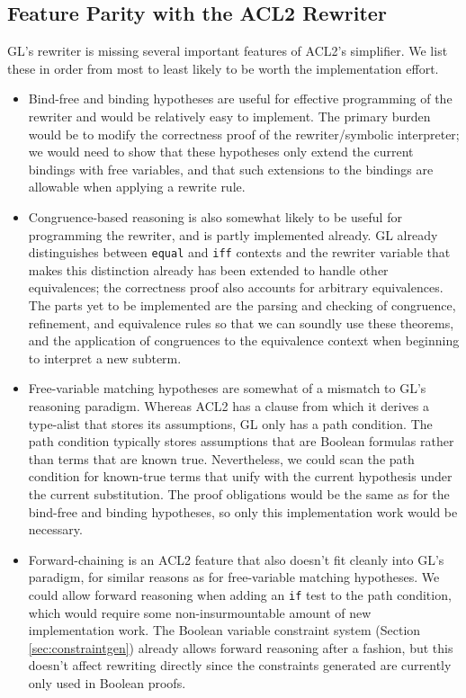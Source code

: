\documentclass[submission,copyright,creativecommons]{eptcs}
\begin{document}
\subsection{Feature Parity with the ACL2 Rewriter}
\label{sec:parity}
GL's rewriter is missing several important features of ACL2's
simplifier.  We list these in order from most to least likely to be
worth the implementation effort.
\begin{itemize}
\item Bind-free and binding hypotheses are useful for effective
  programming of the rewriter and would be relatively easy to
  implement.  The primary burden would be to modify the correctness
  proof of the rewriter/symbolic interpreter; we would need to show that these
  hypotheses only extend the current bindings with free variables, and
  that such extensions to the bindings are allowable when applying a
  rewrite rule.

\item Congruence-based reasoning is also somewhat likely to be useful
  for programming the rewriter, and is partly implemented already.  GL
  already distinguishes between \texttt{equal} and \texttt{iff}
  contexts and the rewriter variable that makes this distinction
  already has been extended to handle other equivalences; the
  correctness proof also accounts for arbitrary equivalences.  The
  parts yet to be implemented are the parsing and checking of
  congruence, refinement, and equivalence rules so that we can soundly
  use these theorems, and the application of congruences to the
  equivalence context when beginning to interpret a new subterm.

\item Free-variable matching hypotheses are somewhat of a mismatch to
  GL's reasoning paradigm.  Whereas ACL2 has a clause from which it
  derives a type-alist that stores its assumptions, GL only has a path
  condition.  The path condition typically stores assumptions that are
  Boolean formulas rather than terms that are known true.
  Nevertheless, we could scan the path condition for known-true terms
  that unify with the current hypothesis under the current
  substitution.  The proof obligations would be the same as for the
  bind-free and binding hypotheses, so only this implementation work
  would be necessary.

\item Forward-chaining is an ACL2 feature that also doesn't fit
  cleanly into GL's paradigm, for similar reasons as for free-variable
  matching hypotheses.  We could allow forward reasoning when adding
  an \texttt{if} test to the path condition, which would require some
  non-insurmountable amount of new implementation work.  The Boolean
  variable constraint system (Section \ref{sec:constraintgen}) already
  allows forward reasoning after a fashion, but this doesn't affect
  rewriting directly since the constraints generated are currently
  only used in Boolean proofs.
\end{itemize}
\end{document}
